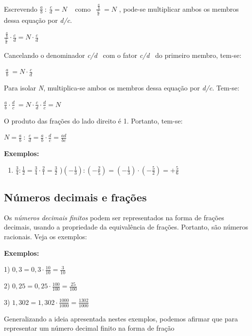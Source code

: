 Escrevendo \( \frac{a}{b}~:~\frac{c}{d}=N \) ~ como  \( ~~\frac{~\frac{a}{b}}{\frac{c}{d}}~ =N \)  , pode-se multiplicar ambos os membros dessa equação por \textit{d/c}.

\quad  \(\frac{~\frac{a}{b}}{\frac{c}{d}}  \cdot  \frac{c}{d} =N  \cdot  \frac{c}{d} \) 

Cancelando o denominador \textit{c/d}~ com o fator \textit{c/d}~ do primeiro membro, tem-se:

\quad  \( ~\frac{a}{b}~ =N  \cdot  \frac{c}{d} \) 

Para isolar \textit{N}, multiplica-se ambos os membros dessa equação por \textit{d/c}. Tem-se:

\quad  \( \frac{a}{b} \cdot  \frac{d}{c}~ =N  \cdot  \frac{c}{d} \cdot  \frac{d}{c}=N \) 

O produto das frações do lado direito é 1. Portanto, tem-se:

\quad  \( N=\frac{a}{b}~:~\frac{c}{d}= \frac{a}{b} \cdot  \frac{d}{c} =\frac{ad}{bc}~ \) ~~~ \qedsymbol{}\quad 

\textbf{Exemplos:}

\begin{enumerate}
	\item  \( \frac{3}{4}:\frac{1}{2}=\frac{3}{4} \cdot \frac{2}{1}=\frac{3}{2} \) \quad {})\(  \left( -\frac{1}{3} \right) : \left( -\frac{2}{5} \right) = \left( -\frac{1}{3} \right)  \cdot  \left( -\frac{5}{2} \right) =+\frac{5}{6} \)
\end{enumerate}

\subsection{Números decimais e frações }

Os \textit{números decimais finitos} podem ser representados na forma de frações decimais, usando a propriedade da equivalência de frações. Portanto, são números racionais. Veja os exemplos:

\textbf{Exemplos:}

1)  \( 0,3=0,3 \cdot \frac{10}{10}=\frac{3}{10}~~ \) \quad \quad \quad \quad 

2)  \( 0,25=0,25 \cdot \frac{100}{100}=\frac{25}{100}~~ \)  \quad \quad \quad \quad 

3)  \( 1,302=1,302 \cdot \frac{1000}{1000}=\frac{1302}{1000}~~ \) ~~~~ 

\begin{justify}
Generalizando a ideia apresentada nestes exemplos, podemos afirmar que para representar um número decimal finito na forma de fração
\end{justify}

